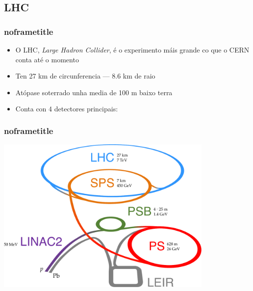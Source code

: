 \documentclass{beamer}
\begin{document}
\subsection{LHC}



\begin{frame}[default, dark, t, backgroundpicture=gpx/lhc-earth.pdf]
  \frametitle{noframetitle}
  \begin{itemize}
    \item O LHC, \emph{Large Hadron Collider}, é o experimento máis grande co
    que o CERN conta até o momento
    \item Ten 27 km de circunferencia --- 8.6 km de raio
    \item Atópase soterrado unha media de 100 m baixo terra
    \item Conta con 4 detectores principais:
  \end{itemize} 

\end{frame}



%
%
%
%
%
%




\begin{frame}[default]
  \frametitle{noframetitle}
  
  \centering
  \includegraphics[width=0.8\textwidth]{gpx/lhc-chain.pdf}

\end{frame}
\end{document}
